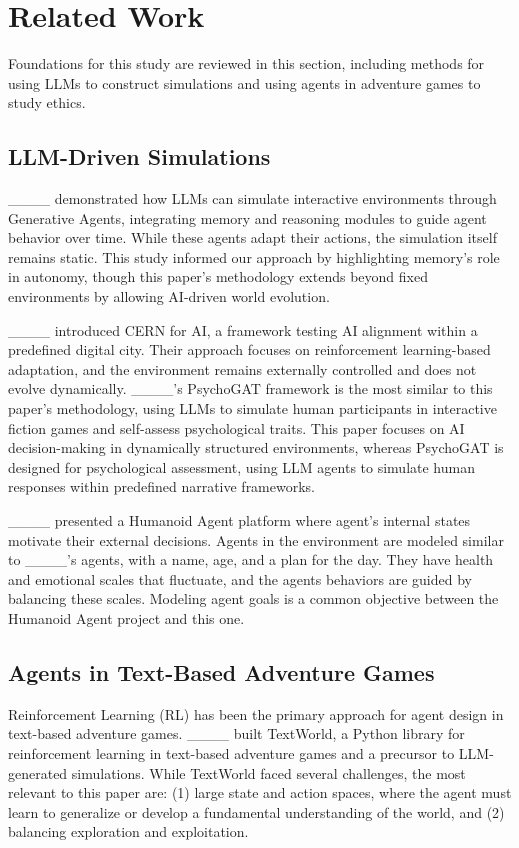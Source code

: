 \section{Related Work}
\vspace{-0.5ex}

Foundations for this study are reviewed in this section, including methods for using LLMs to construct simulations and using agents in adventure games to study ethics.

\subsection{LLM-Driven Simulations}
____ demonstrated how LLMs can simulate interactive environments through Generative Agents, integrating memory and reasoning modules to guide agent behavior over time. While these agents adapt their actions, the simulation itself remains static. This study informed our approach by highlighting memory’s role in autonomy, though this paper's methodology extends beyond fixed environments by allowing AI-driven world evolution.

____ introduced CERN for AI, a framework testing AI alignment within a predefined digital city. Their approach focuses on reinforcement learning-based adaptation, and the environment remains externally controlled and does not evolve dynamically. ____’s PsychoGAT framework is the most similar to this paper's methodology, using LLMs to simulate human participants in interactive fiction games and self-assess psychological traits. This paper focuses on AI decision-making in dynamically structured environments, whereas PsychoGAT is designed for psychological assessment, using LLM agents to simulate human responses within predefined narrative frameworks.

____ presented a Humanoid Agent platform where agent's internal states motivate their external decisions. Agents in the environment are modeled similar to ____'s agents, with a name, age, and a plan for the day. They have health and emotional scales that fluctuate, and the agents behaviors are guided by balancing these scales. Modeling agent goals is a common objective between the Humanoid Agent project and this one.


\subsection{Agents in Text-Based Adventure Games}
Reinforcement Learning (RL) has been the primary approach for agent design in text-based adventure games. ____ built TextWorld, a Python library for reinforcement learning in text-based adventure games and a precursor to LLM-generated simulations. While TextWorld faced several challenges, the most relevant to this paper are: (1) large state and action spaces, where the agent must learn to generalize or develop a fundamental understanding of the world, and (2) balancing exploration and exploitation. 

